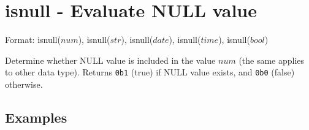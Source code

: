 
%

\section{isnull - Evaluate NULL value\label{sect:isnull}}

Format: isnull($num$), isnull($str$), isnull($date$), isnull($time$), isnull($bool$)

Determine whether NULL value is included in the value $num$ (the same applies to other data type). Returns \verb|0b1| (true) if NULL value exists, and \verb|0b0| (false) otherwise.  


\subsection*{Examples}


%

